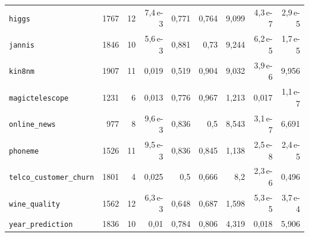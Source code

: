 \begin{table}[htbp]
\begin{tabular}{lrrrrrrrr}
\texttt{higgs} & 1767 & 12 & 7{,}4\,e-3 & 0{,}771 & 0{,}764 & 9{,}099 & 4{,}3\,e-7 & 2{,}9\,e-5 \\
\texttt{jannis} & 1846 & 10 & 5{,}6\,e-3 & 0{,}881 & 0{,}73 & 9{,}244 & 6{,}2\,e-5 & 1{,}7\,e-5 \\
\texttt{kin8nm} & 1907 & 11 & 0{,}019 & 0{,}519 & 0{,}904 & 9{,}032 & 3{,}9\,e-6 & 9{,}956 \\
\texttt{magictelescope} & 1231 & 6 & 0{,}013 & 0{,}776 & 0{,}967 & 1{,}213 & 0{,}017 & 1{,}1\,e-7 \\
\texttt{online\_news} & 977 & 8 & 9{,}6\,e-3 & 0{,}836 & 0{,}5 & 8{,}543 & 3{,}1\,e-7 & 6{,}691 \\
\texttt{phoneme} & 1526 & 11 & 9{,}5\,e-3 & 0{,}836 & 0{,}845 & 1{,}138 & 2{,}5\,e-8 & 2{,}4\,e-5 \\
\texttt{telco\_\allowbreak customer\_\allowbreak churn} & 1801 & 4 & 0{,}025 & 0{,}5 & 0{,}666 & 8{,}2 & 2{,}3\,e-6 & 0{,}496 \\
\texttt{wine\_quality} & 1562 & 12 & 6{,}3\,e-3 & 0{,}648 & 0{,}687 & 1{,}598 & 5{,}3\,e-5 & 3{,}7\,e-4 \\
\texttt{year\_\allowbreak prediction} & 1836 & 10 & 0{,}01 & 0{,}784 & 0{,}806 & 4{,}319 & 0{,}018 & 5{,}906 \\
\bottomrule
\end{tabular}
\end{table}

